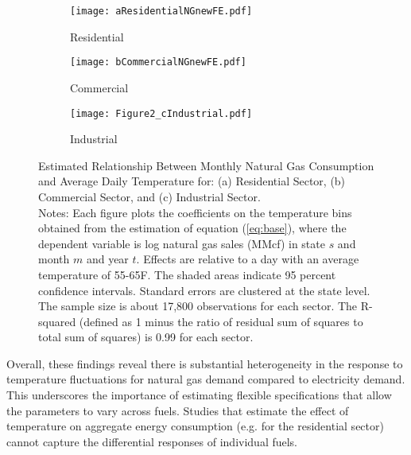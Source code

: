 \documentclass[11pt]{article}
\begin{document}
\begin{figure}
	\centering
	
	\begin{subfigure}{0.49\textwidth}
		\centering
		\caption{Residential}
		\label{fig:residential2}
		\texttt{[image: aResidentialNGnewFE.pdf]}
	\end{subfigure} \hspace{0em}%
	\begin{subfigure}{0.49\textwidth}
		\centering
		\caption{Commercial}
		\label{fig:commercial2}
		\texttt{[image: bCommercialNGnewFE.pdf]}
	\end{subfigure}
	\begin{subfigure}{0.49\textwidth}
		\centering
		\caption{Industrial}
		\label{fig:industrial2}
		\texttt{[image: Figure2\_cIndustrial.pdf]}
	\end{subfigure}
	\caption{Estimated Relationship Between Monthly Natural Gas Consumption and Average Daily Temperature for: (a) Residential Sector, (b) Commercial Sector, and (c) Industrial Sector. \\ {\small Notes: Each figure plots the coefficients on the temperature bins obtained from the estimation of equation (\ref{eq:base}), where the dependent variable is log natural gas sales (MMcf) in state $s$ and month $m$ and year $t$. Effects are relative to a day with an average temperature of 55-65\degree F. The shaded areas indicate 95 percent confidence intervals. Standard errors are clustered at the state level. The sample size is about 17,800 observations for each sector. The R-squared (defined as 1 minus the ratio of residual sum of squares to total sum of squares) is 0.99 for each sector.}} 
	\label{fig:naturalgas}
\end{figure}

Overall, these findings reveal there is substantial heterogeneity in the response to temperature fluctuations for natural gas demand compared to electricity demand. This underscores the importance of estimating flexible specifications that allow the parameters to vary across fuels. Studies that estimate the effect of temperature on aggregate energy consumption (e.g. \cite{Green2011} for the residential sector) cannot capture the differential responses of individual fuels.
\end{document}
